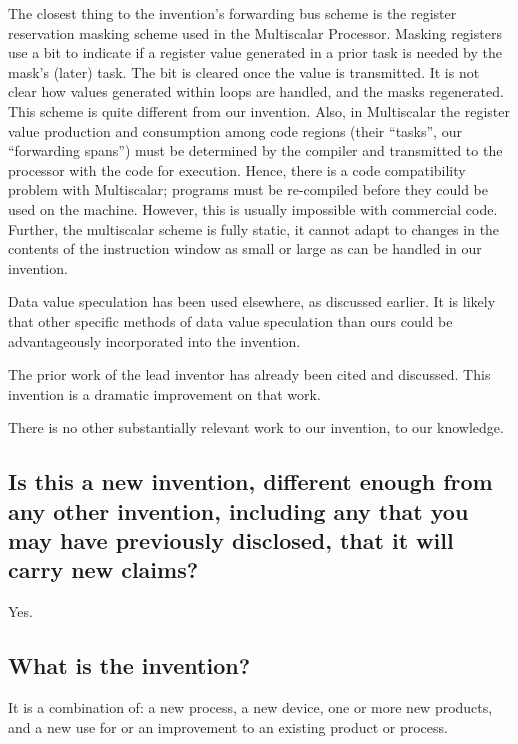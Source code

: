 \documentclass[10pt,dvips]{article}
\begin{document}
The closest thing to the invention's forwarding bus scheme is the
register reservation masking scheme used in the Multiscalar
Processor\cite{Sohi95}. Masking registers use a bit to indicate if
a register value generated in a prior task is needed by the mask's
(later) task. The bit is cleared once the value is transmitted.
It is not clear how values generated within loops are handled,
and the masks regenerated.
This scheme is quite different from our invention. Also, in Multiscalar
the register value production and consumption among code regions
(their ``tasks'', our ``forwarding spans'') must be determined by
the compiler and transmitted to the processor with the code for
execution. Hence, there is a code compatibility problem with
Multiscalar; programs must be re-compiled before they could be used
on the machine. However, this is usually impossible with commercial
code. Further, the multiscalar scheme is fully static, it cannot adapt
to changes in the contents of the instruction window as small or
large as can be handled in our invention.

Data value speculation has been used elsewhere, as discussed earlier.
It is likely that other specific methods of data value speculation
than ours could be advantageously incorporated into the invention.

The prior work of the lead inventor has already been cited and discussed.
This invention is a dramatic improvement on that work.

There is no other substantially relevant work to our invention, to
our knowledge.







\subsection{Is this a new invention, different enough from any other invention,
including any that you may have previously disclosed, that it will carry new
claims?}
Yes. 

\subsection{What is the invention?}
It is a combination of: a new process, a new device, one or more new
products, and a new use for or
an improvement to an existing product or process.
\end{document}
